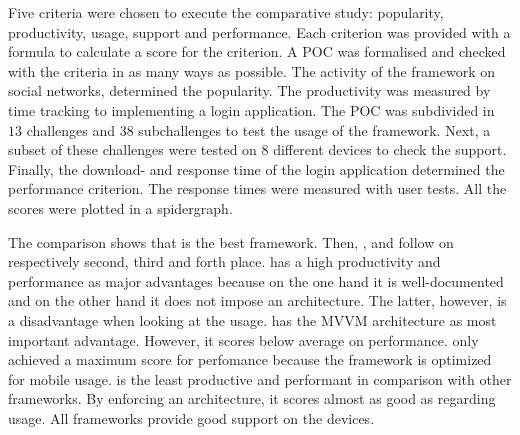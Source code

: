 \documentclass[a4paper]{artikel3}
\begin{document}
Five criteria were chosen to execute the comparative study:  popularity,  productivity,  usage,  support and performance.
Each criterion was provided with a formula to calculate a score for the criterion.
A POC was formalised and checked with the criteria in as many ways as possible.
The activity of the framework on social networks, determined the popularity.
The productivity was measured by time tracking to implementing a login application.
The POC was subdivided in $13$ challenges and $38$ subchallenges to test the usage of the framework.
Next,  a subset of these challenges were tested on $8$ different devices to check the support.
Finally,  the download- and response time of the login application determined the performance criterion.
The response times were measured with user tests.
All the scores were plotted in a spidergraph.

The comparison shows that \jqma{} is the best framework.
Then, \kendoa{},  \lungo{} and \sta{} follow on respectively second, third and forth place.
\jqma{} has a high productivity and performance as major advantages because on the one hand it is well-documented and on the other hand it does not impose an architecture.
The latter,  however,  is a disadvantage when looking at the usage.
\kendoa{} has the MVVM architecture as most important advantage.
However,  it scores below average on performance.
\lungo{} only achieved a maximum score for perfomance because the framework is optimized for mobile usage.
\sta{} is the least productive and performant in comparison with other frameworks.
By enforcing an architecture,  it scores almost as good as \kendo{} regarding usage.
All frameworks provide good support on the devices.



%


\end{document}
